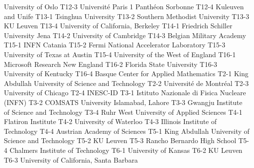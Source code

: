 \begin{multicols}{2}
{University of Oslo}
{T12-3}
{}
{Université Paris 1 Panthéon Sorbonne}
{T12-4}
{}
{Kuleuven and Unife}
{T13-1}
{}
{Tsinghua University}
{T13-2}
{}
{Southern Methodist University}
{T13-3}
{}
{KU Leuven}
{T13-4}
{}
{University of California, Berkeley}
{T14-1}
{}
{Friedrich Schiller University Jena}
{T14-2}
{}
{University of Cambridge}
{T14-3}
{}
{Belgian Military Academy}
{T15-1}
{}
{INFN Catania}
{T15-2}
{}
{Fermi National Accelerator Laboratory}
{T15-3}
{}
{University of Texas at Austin}
{T15-4}
{}
{University of the West of England}
{T16-1}
{}
{Microsoft Research New England}
{T16-2}
{}
{Florida State University}
{T16-3}
{}
{University of Kentucky}
{T16-4}
{}
{Basque Center for Applied Mathematics}
{T2-1}
{}
{King Abdullah University of Science and Technology}
{T2-2}
{}
{Université de Montréal}
{T2-3}
{}
{University of Chicago}
{T2-4}
{}
{INESC-ID}
{T3-1}
{}
{Istituto Nazionale di Fisica Nucleare (INFN)}
{T3-2}
{}
{COMSATS University Islamabad, Lahore}
{T3-3}
{}
{Gwangju Institute of Science and Technology}
{T3-4}
{}
{Ruhr West University of Applied Sciences}
{T4-1}
{}
{Flatiron Institute}
{T4-2}
{}
{University of Waterloo}
{T4-3}
{}
{Illinois Institute of Technology}
{T4-4}
{}
{Austrian Academy of Sciences}
{T5-1}
{}
{King Abdullah University of Science and Technology}
{T5-2}
{}
{KU Leuven}
{T5-3}
{}
{Rancho Bernardo High School}
{T5-4}
{}
{Chalmers Institute of Technology}
{T6-1}
{}
{University of Kansas}
{T6-2}
{}
{KU Leuven}
{T6-3}
{}
{University of California, Santa Barbara}

\end{multicols}
